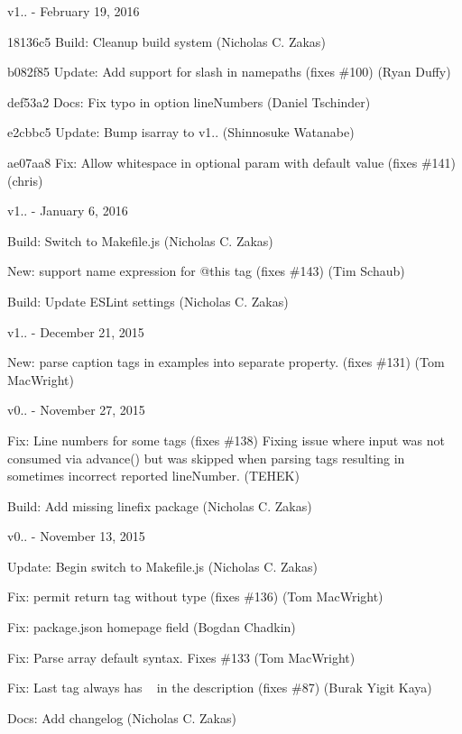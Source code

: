 v1.. -\/ February 19, 2016


\begin{DoxyItemize}
\item 18136c5 Build\+: Cleanup build system (Nicholas C. Zakas)
\item b082f85 Update\+: Add support for slash in namepaths (fixes \#100) (Ryan Duffy)
\item def53a2 Docs\+: Fix typo in option line\+Numbers (Daniel Tschinder)
\item e2cbbc5 Update\+: Bump isarray to v1.. (Shinnosuke Watanabe)
\item ae07aa8 Fix\+: Allow whitespace in optional param with default value (fixes \#141) (chris)
\end{DoxyItemize}

v1.. -\/ January 6, 2016


\begin{DoxyItemize}
\item Build\+: Switch to Makefile.\+js (Nicholas C. Zakas)
\item New\+: support name expression for @this tag (fixes \#143) (Tim Schaub)
\item Build\+: Update ESLint settings (Nicholas C. Zakas)
\end{DoxyItemize}

v1.. -\/ December 21, 2015


\begin{DoxyItemize}
\item New\+: parse caption tags in examples into separate property. (fixes \#131) (Tom Mac\+Wright)
\end{DoxyItemize}

v0.. -\/ November 27, 2015


\begin{DoxyItemize}
\item Fix\+: Line numbers for some tags (fixes \#138) Fixing issue where input was not consumed via advance() but was skipped when parsing tags resulting in sometimes incorrect reported line\+Number. (TEHEK)
\item Build\+: Add missing linefix package (Nicholas C. Zakas)
\end{DoxyItemize}

v0.. -\/ November 13, 2015


\begin{DoxyItemize}
\item Update\+: Begin switch to Makefile.\+js (Nicholas C. Zakas)
\item Fix\+: permit return tag without type (fixes \#136) (Tom Mac\+Wright)
\item Fix\+: package.\+json homepage field (Bogdan Chadkin)
\item Fix\+: Parse array default syntax. Fixes \#133 (Tom Mac\+Wright)
\item Fix\+: Last tag always has ~\newline
 in the description (fixes \#87) (Burak Yigit Kaya)
\item Docs\+: Add changelog (Nicholas C. Zakas)
\end{DoxyItemize}

